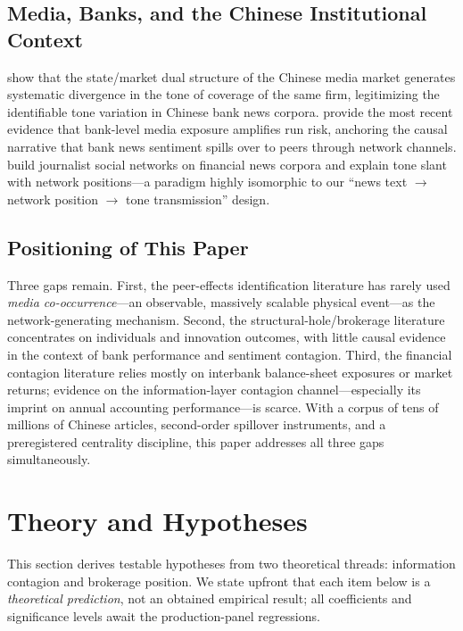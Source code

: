 \subsection{Media, Banks, and the Chinese Institutional Context}

\textcite{you2018power} show that the state/market dual structure of
the Chinese media market generates systematic divergence in the tone
of coverage of the same firm, legitimizing the identifiable tone
variation in Chinese bank news corpora. \textcite{cookson2026social}
provide the most recent evidence that bank-level media exposure
amplifies run risk, anchoring the causal narrative that bank news
sentiment spills over to peers through network channels.
\textcite{xu2024news} build journalist social networks on financial
news corpora and explain tone slant with network positions---a
paradigm highly isomorphic to our ``news text $\to$ network position
$\to$ tone transmission'' design.

\subsection{Positioning of This Paper}

Three gaps remain. First, the peer-effects identification literature
has rarely used \emph{media co-occurrence}---an observable, massively
scalable physical event---as the network-generating mechanism.
Second, the structural-hole/brokerage literature concentrates on
individuals and innovation outcomes, with little causal evidence in
the context of bank performance and sentiment contagion. Third, the
financial contagion literature relies mostly on interbank
balance-sheet exposures or market returns; evidence on the
information-layer contagion channel---especially its imprint on
annual accounting performance---is scarce. With a corpus of tens of
millions of Chinese articles, second-order spillover instruments,
and a preregistered centrality discipline, this paper addresses all
three gaps simultaneously.

\section{Theory and Hypotheses}\label{sec:theory}

This section derives testable hypotheses from two theoretical
threads: information contagion and brokerage position. We state
upfront that each item below is a \emph{theoretical prediction}, not
an obtained empirical result; all coefficients and significance
levels await the production-panel regressions.

